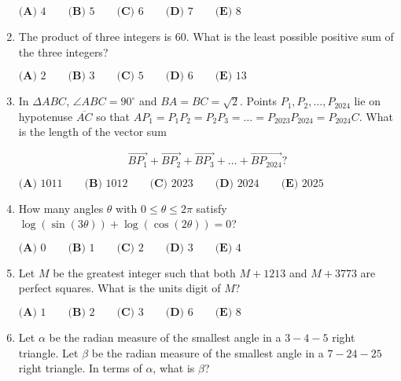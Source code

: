 \documentclass{article}
\begin{document}
\begin{enumerate}[label=\arabic*., itemsep=0.5em]
\(\textbf{(A) }4\qquad\textbf{(B) }5\qquad\textbf{(C) }6\qquad\textbf{(D) }7\qquad\textbf{(E) }8\)\par \vspace{0.5em}\item The product of three integers is \(60\). What is the least possible positive sum of the three integers?

\(\textbf{(A) } 2 \qquad \textbf{(B) } 3 \qquad \textbf{(C) } 5 \qquad \textbf{(D) } 6 \qquad \textbf{(E) } 13\)\par \vspace{0.5em}\item In \(\Delta ABC\), \(\angle ABC = 90^\circ\) and \(BA = BC = \sqrt{2}\). Points \(P_1, P_2, \dots, P_{2024}\) lie on hypotenuse \(\overline{AC}\) so that \(AP_1= P_1P_2 = P_2P_3 = \dots = P_{2023}P_{2024} = P_{2024}C\). What is the length of the vector sum

\begin{equation*}
\overrightarrow{BP_1} + \overrightarrow{BP_2} + \overrightarrow{BP_3} + \dots + \overrightarrow{BP_{2024}}?
\end{equation*}

\(
\textbf{(A) }1011 \qquad
\textbf{(B) }1012 \qquad
\textbf{(C) }2023 \qquad
\textbf{(D) }2024 \qquad
\textbf{(E) }2025 \qquad
\)\par \vspace{0.5em}\item How many angles \(\theta\) with \(0\le\theta\le2\pi\) satisfy \(\log(\sin(3\theta))+\log(\cos(2\theta))=0\)?  

\( \textbf{(A) }0 \qquad \textbf{(B) }1 \qquad \textbf{(C) }2 \qquad \textbf{(D) }3 \qquad \textbf{(E) }4 \qquad \)\par \vspace{0.5em}\item Let \(M\) be the greatest integer such that both \(M + 1213\) and \(M + 3773\) are perfect squares. What is the units digit of \(M\)?

\(
\textbf{(A) }1 \qquad
\textbf{(B) }2 \qquad
\textbf{(C) }3 \qquad
\textbf{(D) }6 \qquad
\textbf{(E) }8 \qquad
\)\par \vspace{0.5em}\item Let \(\alpha\) be the radian measure of the smallest angle in a \(3{-}4{-}5\) right triangle. Let \(\beta\) be the radian measure of the smallest angle in a \(7{-}24{-}25\) right triangle. In terms of \(\alpha\), what is \(\beta\)?


\end{enumerate}
\end{document}
